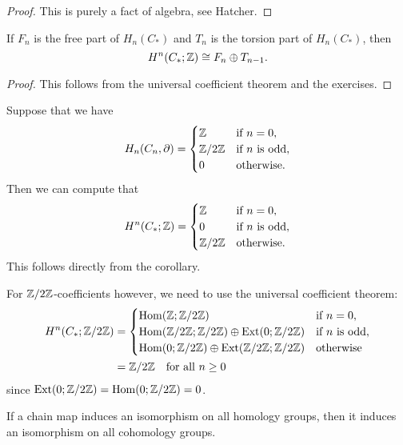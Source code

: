 \begin{proof}
  This is purely a fact of algebra, see Hatcher.
\end{proof}

\begin{corollary}
  If $F_n$ is the free part of $H_n(C_*)$ and
  $T_n$ is the torsion part of $H_n(C_*)$, then
  \[H^n(C_*; \mathbb{Z}) \cong F_n \oplus T_{n - 1}.\]
\end{corollary}

\begin{proof}
  This follows from the universal coefficient theorem
  and the exercises.
\end{proof}

\begin{example}
  Suppose that we have
  \[
    H_n(C_n, \partial) =
    \begin{cases}
      \mathbb{Z} & \text{if $n = 0$}, \\
      \mathbb{Z} / 2\mathbb{Z} & \text{if $n$ is odd}, \\
      0 & \text{otherwise}.
    \end{cases}
  \]
  Then we can compute that
  \[
    H^n(C_*; \mathbb{Z}) =
    \begin{cases}
      \mathbb{Z} & \text{if $n = 0$}, \\
      0 & \text{if $n$ is odd}, \\
      \mathbb{Z} / 2\mathbb{Z} & \text{otherwise}.
    \end{cases}
  \]
  This follows directly from the corollary.

  For $\mathbb{Z} / 2\mathbb{Z}$-coefficients however, we need to
  use the universal coefficient theorem:
  \begin{align*}
    H^n(C_*; \mathbb{Z} / 2\mathbb{Z})
    &=
    \begin{cases}
      \operatorname{Hom}(\mathbb{Z}; \mathbb{Z} / 2\mathbb{Z}) & \text{if $n = 0$}, \\
      \operatorname{Hom}(\mathbb{Z} / 2\mathbb{Z}; \mathbb{Z} / 2\mathbb{Z}) \oplus \operatorname{Ext}(0; \mathbb{Z} / 2\mathbb{Z}) & \text{if $n$ is odd}, \\
      \operatorname{Hom}(0; \mathbb{Z} / 2\mathbb{Z}) \oplus \operatorname{Ext}(\mathbb{Z} / 2\mathbb{Z}; \mathbb{Z} / 2\mathbb{Z}) & \text{otherwise}
    \end{cases} \\
    &= \mathbb{Z} / 2\mathbb{Z} \quad \text{for all $n \ge 0$}
  \end{align*}
  since $\operatorname{Ext}(0; \mathbb{Z} / 2\mathbb{Z}) = \operatorname{Hom}(0; \mathbb{Z} / 2\mathbb{Z}) = 0$.
\end{example}

\begin{corollary}\label{cor:iso-cohom}
  If a chain map induces an isomorphism on
  all homology groups, then it induces an
  isomorphism on all cohomology groups.
\end{corollary}

